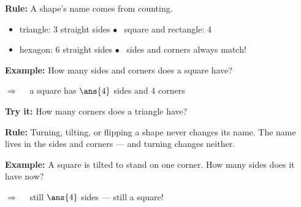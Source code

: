 \documentclass[12pt]{article}
\begin{document}


\begin{formulabox}
\textbf{Rule:} A shape's name comes from counting.\par
\begin{itemize}[leftmargin=1.2cm, itemsep=1pt, topsep=2pt]
  \item triangle: 3 straight sides \quad $\bullet$ \ square and rectangle: 4
  \item hexagon: 6 straight sides \quad $\bullet$ \ sides and corners always match!
\end{itemize}
\end{formulabox}

\begin{examplebox}
\textbf{Example:} \quad How many sides and corners does a square have?

$\Rightarrow\quad$ a square has $\ans{4}$ sides and 4 corners
\end{examplebox}

\begin{tryitbox}
\textbf{Try it:} \quad How many corners does a triangle have?\\[2pt]
\end{tryitbox}


\begin{formulabox}
\textbf{Rule:} Turning, tilting, or flipping a shape never changes its name.
The name lives in the sides and corners --- and turning changes neither.
\end{formulabox}

\begin{examplebox}
\textbf{Example:} \quad A square is tilted to stand on one corner. How many
sides does it have now?

$\Rightarrow\quad$ still $\ans{4}$ sides --- still a square!
\end{examplebox}
\end{document}
